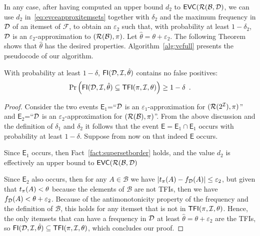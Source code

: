 In any case, after having computed an upper bound $d_2$ to
$\mathsf{EVC}(\mathcal{R}(\mathcal{B},{\cal D})$, we can use $d_2$ in~\eqref{eq:evceapproxitemsets}
together with $\delta_2$ and the maximum frequency in ${\cal D}$ of an itemset of
$\mathcal{F}$, to obtain an $\varepsilon_2$ such that, with probability
at least $1-\delta_2$, ${\cal D}$ is an $\varepsilon_2$-approximation to
$(\mathcal{R}(\mathcal{B}),\pi)$. Let $\hat{\theta}=\theta+\varepsilon_2$. The
following Theorem shows that $\hat{\theta}$ has the desired properties.
Algorithm~\ref{alg:vcfull} presents the pseudocode of our algorithm.

\begin{theorem}\label{lem:vcfull}
With probability at least $1-\delta$, $\mathsf{FI}({\cal D},{\cal I},\hat\theta)$ contains no
false positives:
\[
\Pr\left(\mathsf{FI}({\cal D},{\cal I},\hat\theta)\subseteq\mathsf{TFI}(\pi,{\cal I},\theta)\right)\ge 1-\delta\enspace.\]
\end{theorem}
\begin{proof}
  Consider the two events $\mathsf{E}_1$=``${\cal D}$ is an
  $\varepsilon_1$-approximation for $(\mathcal{R}(2^{\cal I}),\pi)$'' and
  $\mathsf{E}_2$=``${\cal D}$ is an $\varepsilon_2$-approximation for
  $(\mathcal{R}(\mathcal{B}),\pi)$''. From the above discussion and the definition
  of $\delta_1$ and $\delta_2$ it follows that the event
  $\mathsf{E}=\mathsf{E}_1\cap\mathsf{E}_1$ occurs with probability at least
  $1-\delta$. Suppose from now on that indeed $\mathsf{E}$ occurs.

  Since $\mathsf{E}_1$ occurs, then Fact~\ref{fact:supersetborder} holds, and
  the value $d_2$ is effectively an upper bound to $\mathsf{EVC}(\mathcal{R}(\mathcal{B},{\cal D})$

  Since $\mathsf{E}_2$ also occurs, then for any $A\in\mathcal{B}$ we have
  $|t_\pi(A)-f_{\cal D}(A)|\le\varepsilon_2$, but given that $t_\pi(A)<\theta$
  because the elements of $\mathcal{B}$ are not TFIs, then we have
  $f_{\cal D}(A)<\theta+\varepsilon_2$. Because of the antimonotonicity property of
  the frequency and the definition of $\mathcal{B}$, this holds for any itemset
  that is not in $\mathsf{TFI}(\pi,{\cal I},\theta)$. Hence, the only itemsets that can
  have a frequency in ${\cal D}$ at least $\hat{\theta}=\theta+\varepsilon_2$ are the
  TFIs, so $\mathsf{FI}({\cal D},{\cal I},\hat{\theta})\subseteq\mathsf{TFI}(\pi,{\cal I},\theta)$, which
  concludes our proof.
\end{proof}

